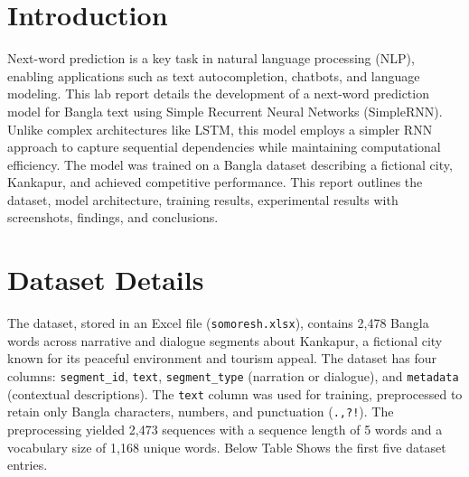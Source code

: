 \documentclass[12pt]{article}
\begin{document}
\section*{Introduction}
Next-word prediction is a key task in natural language processing (NLP), enabling applications such as text autocompletion, chatbots, and language modeling. This lab report details the development of a next-word prediction model for Bangla text using Simple Recurrent Neural Networks (SimpleRNN). Unlike complex architectures like LSTM, this model employs a simpler RNN approach to capture sequential dependencies while maintaining computational efficiency. The model was trained on a Bangla dataset describing a fictional city, Kankapur, and achieved competitive performance. This report outlines the dataset, model architecture, training results, experimental results with screenshots, findings, and conclusions.

\section*{Dataset Details}
The dataset, stored in an Excel file (\texttt{somoresh.xlsx}), contains 2,478 Bangla words across narrative and dialogue segments about Kankapur, a fictional city known for its peaceful environment and tourism appeal. The dataset has four columns: \texttt{segment\_id}, \texttt{text}, \texttt{segment\_type} (narration or dialogue), and \texttt{metadata} (contextual descriptions). The \texttt{text} column was used for training, preprocessed to retain only Bangla characters, numbers, and punctuation (\texttt{.,?!}). The preprocessing yielded 2,473 sequences with a sequence length of 5 words and a vocabulary size of 1,168 unique words. Below Table Shows the first five dataset entries.
\end{document}
